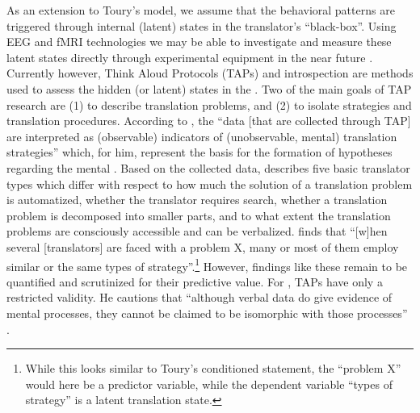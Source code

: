 \documentclass[output=paper]{LSP/langsci}
\begin{document}
As an extension to Toury's model, we assume that the behavioral patterns are triggered through internal (latent) states in the translator's ``black-box''. Using EEG and fMRI technologies we may be able to investigate and measure these latent states directly through experimental equipment in the near future \citep{Annoni2012}. Currently however, Think Aloud Protocols (TAPs) and introspection are methods used to assess the hidden (or latent) states in the . Two of the main goals of TAP research are (1) to describe translation problems, and (2) to isolate strategies and translation procedures. According to \citet[599]{Loerscher2005}, the ``data [that are collected through TAP] are interpreted as (observable) indicators of (unobservable, mental) translation strategies'' which, for him, represent the basis for the formation of hypotheses regarding the mental . Based on the collected data, \citet{Loerscher1991} describes five basic translator types which differ with respect to how much the solution of a translation problem is automatized, whether the translator requires search, whether a translation problem is decomposed into smaller parts, and to what extent the translation problems are consciously accessible and can be verbalized. \citet[280]{Loerscher1991} finds that ``[w]hen several [translators] are faced with a problem X, many or most of them employ similar or the same types of strategy''.\footnote{While this looks similar to Toury's conditioned statement, the ``problem X'' would here be a predictor variable, while the dependent variable ``types of strategy'' is a latent translation state.} However, findings like these remain to be quantified and scrutinized for their predictive value. For \citet{Krings1986Translation}, TAPs have only a restricted validity. He cautions that ``although verbal data do give evidence of mental processes, they cannot be claimed to be isomorphic with those processes'' \citep[264]{Krings1986Translation}.
\end{document}
